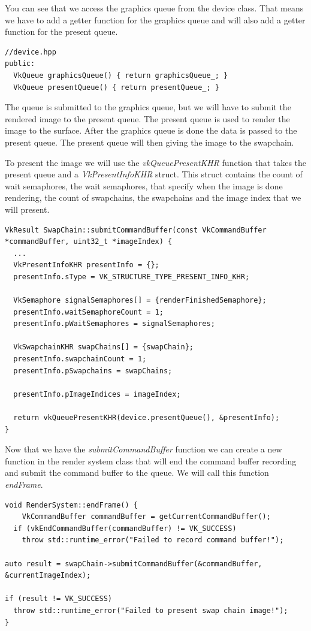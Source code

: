 \documentclass[12pt]{report} \usepackage{preamble}
\begin{document}
You can see that we access the graphics queue from the device class. That means we have to add a getter function for the graphics queue
and will also add a getter function for the present queue.

\begin{lstlisting}[Language=C++]
//device.hpp
public:
  VkQueue graphicsQueue() { return graphicsQueue_; }
  VkQueue presentQueue() { return presentQueue_; }
\end{lstlisting}

The queue is submitted to the graphics queue, but we will have to submit the rendered image to the present queue. The present queue
is used to render the image to the surface. After the graphics queue is done the data is passed to the present queue. The present queue
will then giving the image to the swapchain.

To present the image we will use the \textit{vkQueuePresentKHR} function that takes the present queue and a \textit{VkPresentInfoKHR} struct.
This struct contains the count of wait semaphores, the wait semaphores, that specify when the image is done rendering, the count of swapchains,
the swapchains and the image index that we will present.

\begin{lstlisting}[Language=C++]
VkResult SwapChain::submitCommandBuffer(const VkCommandBuffer *commandBuffer, uint32_t *imageIndex) {
  ...
  VkPresentInfoKHR presentInfo = {};
  presentInfo.sType = VK_STRUCTURE_TYPE_PRESENT_INFO_KHR;

  VkSemaphore signalSemaphores[] = {renderFinishedSemaphore};
  presentInfo.waitSemaphoreCount = 1;
  presentInfo.pWaitSemaphores = signalSemaphores;

  VkSwapchainKHR swapChains[] = {swapChain};
  presentInfo.swapchainCount = 1;
  presentInfo.pSwapchains = swapChains;

  presentInfo.pImageIndices = imageIndex;

  return vkQueuePresentKHR(device.presentQueue(), &presentInfo);
}
\end{lstlisting}

Now that we have the \textit{submitCommandBuffer} function we can create a new function in the render system class that will end the command buffer
recording and submit the command buffer to the queue. We will call this function \textit{endFrame}.

\begin{lstlisting}[Language=C++]
void RenderSystem::endFrame() {
	VkCommandBuffer commandBuffer = getCurrentCommandBuffer();
  if (vkEndCommandBuffer(commandBuffer) != VK_SUCCESS)
    throw std::runtime_error("Failed to record command buffer!");

auto result = swapChain->submitCommandBuffer(&commandBuffer, &currentImageIndex);

if (result != VK_SUCCESS)
  throw std::runtime_error("Failed to present swap chain image!");
}
\end{lstlisting}
\end{document}
